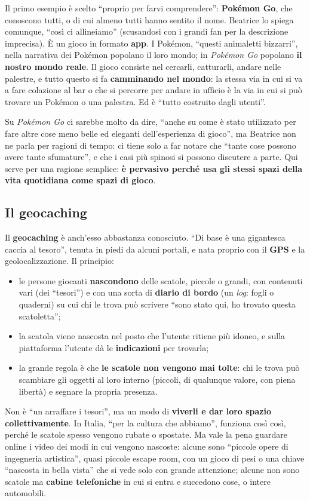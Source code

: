 Il primo esempio è scelto ``proprio per farvi comprendere'': \textbf{Pokémon
Go}, che conoscono tutti, o di cui almeno tutti hanno sentito il nome. Beatrice
lo spiega comunque, ``così ci allineiamo'' (scusandosi con i grandi fan per la
descrizione imprecisa). È un gioco in formato \textbf{app}. I Pokémon, ``questi
animaletti bizzarri'', nella narrativa dei Pokémon popolano il loro mondo; in
\emph{Pokémon Go} popolano \textbf{il nostro mondo reale}. Il gioco consiste nel
cercarli, catturarli, andare nelle palestre, e tutto questo si fa
\textbf{camminando nel mondo}: la stessa via in cui si va a fare colazione al
bar o che si percorre per andare in ufficio è la via in cui si può trovare un
Pokémon o una palestra. Ed è ``tutto costruito dagli utenti''.

Su \emph{Pokémon Go} ci sarebbe molto da dire, ``anche su come è stato
utilizzato per fare altre cose meno belle ed eleganti dell'esperienza di
gioco'', ma Beatrice non ne parla per ragioni di tempo: ci tiene solo a far
notare che ``tante cose possono avere tante sfumature'', e che i casi più
spinosi si possono discutere a parte. Qui serve per una ragione semplice:
\textbf{è pervasivo perché usa gli stessi spazi della vita quotidiana come spazi
di gioco}.

\subsection{Il geocaching}

Il \textbf{geocaching} è anch'esso abbastanza conosciuto. ``Di base è una
gigantesca caccia al tesoro'', tenuta in piedi da alcuni portali, e nata
proprio con il \textbf{GPS} e la geolocalizzazione. Il principio:
\begin{itemize}
  \item le persone giocanti \textbf{nascondono} delle scatole, piccole o
        grandi, con contenuti vari (dei ``tesori'') e con una sorta di
        \textbf{diario di bordo} (un \emph{log}: fogli o quaderni) su cui chi le
        trova può scrivere ``sono stato qui, ho trovato questa scatoletta'';
  \item la scatola viene nascosta nel posto che l'utente ritiene più idoneo, e
        sulla piattaforma l'utente dà le \textbf{indicazioni} per trovarla;
  \item la grande regola è che \textbf{le scatole non vengono mai tolte}: chi le
        trova può scambiare gli oggetti al loro interno (piccoli, di qualunque
        valore, con piena libertà) e segnare la propria presenza.
\end{itemize}
Non è ``un arraffare i tesori'', ma un modo di \textbf{viverli e dar loro
spazio collettivamente}. In Italia, ``per la cultura che abbiamo'', funziona
così così, perché le scatole spesso vengono rubate o spostate. Ma vale la pena
guardare online i video dei modi in cui vengono nascoste: alcune sono ``piccole
opere di ingegneria artistica'', quasi piccole escape room, con un gioco di pesi
o una chiave ``nascosta in bella vista'' che si vede solo con grande
attenzione; alcune non sono scatole ma \textbf{cabine telefoniche} in cui si
entra e succedono cose, o intere automobili.


